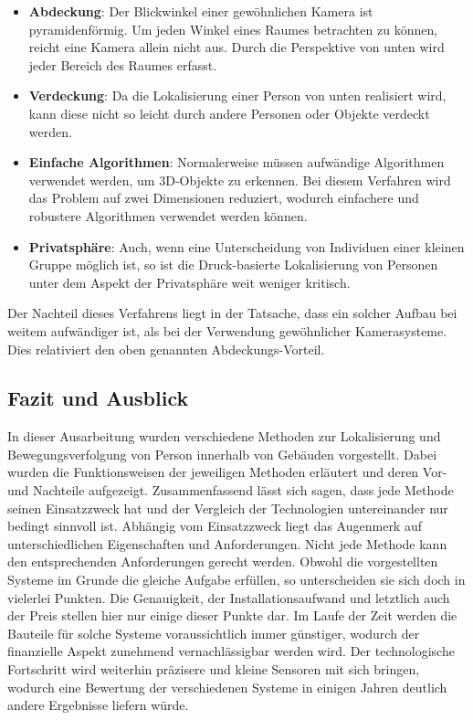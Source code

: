 \begin{itemize}
\item \textbf{Abdeckung}: Der Blickwinkel einer gewöhnlichen Kamera ist pyramidenförmig. Um jeden Winkel eines Raumes betrachten zu können, reicht eine Kamera allein nicht aus. Durch die Perspektive von unten wird jeder Bereich des Raumes erfasst.
\item \textbf{Verdeckung}: Da die Lokalisierung einer Person von unten realisiert wird, kann diese nicht so leicht durch andere Personen oder Objekte verdeckt werden.
\item \textbf{Einfache Algorithmen}: Normalerweise müssen aufwändige Algorithmen verwendet werden, um 3D-Objekte zu erkennen. Bei diesem Verfahren wird das Problem auf zwei Dimensionen reduziert, wodurch einfachere und robustere Algorithmen verwendet werden können.
\item \textbf{Privatsphäre}: Auch, wenn eine Unterscheidung von Individuen einer kleinen Gruppe möglich ist, so ist die Druck-basierte Lokalisierung von Personen unter dem Aspekt der Privatsphäre weit weniger kritisch.
\end{itemize} 

Der Nachteil dieses Verfahrens liegt in der Tatsache, dass ein solcher Aufbau bei weitem aufwändiger ist, als bei der Verwendung gewöhnlicher Kamerasysteme. Dies relativiert den oben genannten Abdeckungs-Vorteil.

\subsection{Fazit und Ausblick}
In dieser Ausarbeitung wurden verschiedene Methoden zur Lokalisierung und Bewegungsverfolgung von Person innerhalb von Gebäuden vorgestellt. Dabei wurden die Funktionsweisen der jeweiligen Methoden erläutert und deren Vor- und Nachteile aufgezeigt.\newline\newline 
Zusammenfassend lässt sich sagen, dass jede Methode seinen Einsatzzweck hat und der Vergleich der Technologien untereinander nur bedingt sinnvoll ist. Abhängig vom Einsatzzweck liegt das Augenmerk auf unterschiedlichen Eigenschaften und Anforderungen. Nicht jede Methode kann den entsprechenden Anforderungen gerecht werden. Obwohl die vorgestellten Systeme im Grunde die gleiche Aufgabe erfüllen, so unterscheiden sie sich doch in vielerlei Punkten. Die Genauigkeit, der Installationsaufwand und letztlich auch der Preis stellen hier nur einige dieser Punkte dar. \newline\newline
Im Laufe der Zeit werden die Bauteile für solche Systeme voraussichtlich immer günstiger, wodurch der finanzielle Aspekt zunehmend vernachlässigbar werden wird. Der technologische Fortschritt wird weiterhin präzisere und kleine Sensoren mit sich bringen, wodurch eine Bewertung der verschiedenen Systeme in einigen Jahren deutlich andere Ergebnisse liefern würde. 

